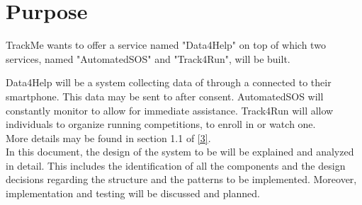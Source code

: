 \documentclass[../../DD.tex]{subfiles}
\begin{document}
\section{Purpose}

	TrackMe wants to offer a service named "Data4Help" on top of which two services, named "AutomatedSOS" and "Track4Run", will be built.
	
	Data4Help will be a system collecting data of  through a  connected to their smartphone. This data may be sent to  after  consent.
	AutomatedSOS will constantly monitor  to allow for immediate assistance.
	Track4Run will allow individuals to organize running competitions, to enroll in or watch one.\\

	More details may be found in section 1.1 of \hyperref[ref:3]{[3]}.\\

	In this document, the design of the system to be will be explained and analyzed in detail. This includes the identification of all the components and the design decisions regarding the structure and the patterns to be implemented. Moreover, implementation and testing will be discussed and planned.
\end{document}
